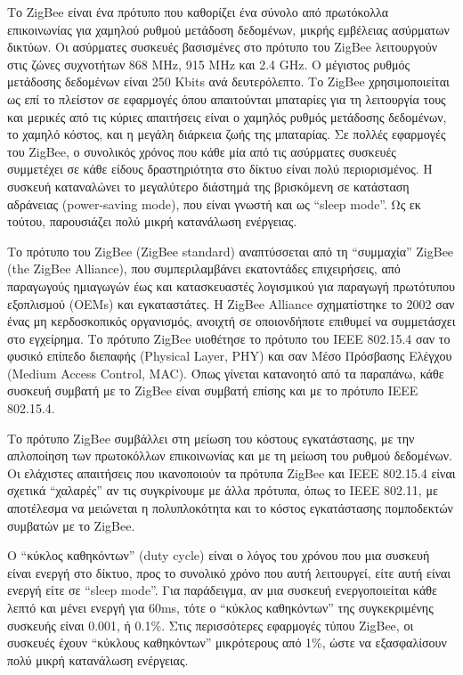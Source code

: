 \documentclass[12pt, a4paper, oneside]{report}
\begin{document}
Το ZigBee είναι ένα πρότυπο που καθορίζει ένα σύνολο από πρωτόκολλα επικοινωνίας για χαμηλού ρυθμού μετάδοση δεδομένων, μικρής εμβέλειας ασύρματων δικτύων. Οι ασύρματες συσκευές βασισμένες στο πρότυπο του ZigBee λειτουργούν στις ζώνες συχνοτήτων 868 MHz, 915 MHz και 2.4 GHz. Ο μέγιστος ρυθμός μετάδοσης δεδομένων είναι 250 Kbits ανά δευτερόλεπτο. Το ZigBee χρησιμοποιείται ως επί το πλείστον σε εφαρμογές όπου απαιτούνται μπαταρίες για τη λειτουργία τους και μερικές από τις κύριες απαιτήσεις είναι ο χαμηλός ρυθμός μετάδοσης δεδομένων, το χαμηλό κόστος, και η μεγάλη διάρκεια ζωής της μπαταρίας. Σε πολλές εφαρμογές του ZigBee, ο συνολικός χρόνος που κάθε μία από τις ασύρματες συσκευές συμμετέχει σε κάθε είδους δραστηριότητα στο δίκτυο είναι πολύ περιορισμένος. Η συσκευή καταναλώνει το μεγαλύτερο διάστημά της βρισκόμενη σε κατάσταση αδράνειας (power-saving mode), που είναι γνωστή και ως ``sleep mode''. Ως εκ τούτου, παρουσιάζει πολύ μικρή κατανάλωση ενέργειας.

Το πρότυπο του ZigBee (ZigBee standard) αναπτύσσεται από τη ``συμμαχία'' ZigBee (the ZigBee Alliance), που συμπεριλαμβάνει εκατοντάδες επιχειρήσεις, από παραγωγούς ημιαγωγών έως και κατασκευαστές λογισμικού για παραγωγή πρωτότυπου εξοπλισμού (OEMs) και εγκαταστάτες. Η ZigBee Alliance σχηματίστηκε το 2002 σαν ένας μη κερδοσκοπικός οργανισμός, ανοιχτή σε οποιονδήποτε επιθυμεί να συμμετάσχει στο εγχείρημα. Το πρότυπο ZigBee υιοθέτησε το πρότυπο του IEEE 802.15.4 σαν το φυσικό επίπεδο διεπαφής (Physical Layer, PHY) και σαν Μέσο Πρόσβασης Ελέγχου (Medium Access Control, MAC). Όπως γίνεται κατανοητό από τα παραπάνω, κάθε συσκευή συμβατή με το ZigBee είναι συμβατή επίσης και με το πρότυπο IEEE 802.15.4.

Το πρότυπο ZigBee συμβάλλει στη μείωση του κόστους εγκατάστασης, με την απλοποίηση των πρωτοκόλλων επικοινωνίας και με τη μείωση του ρυθμού δεδομένων. Οι ελάχιστες απαιτήσεις που ικανοποιούν τα πρότυπα ZigBee και IEEE 802.15.4 είναι σχετικά ``χαλαρές'' αν τις συγκρίνουμε με άλλα πρότυπα, όπως το IEEE 802.11, με αποτέλεσμα να μειώνεται η πολυπλοκότητα και το κόστος εγκατάστασης πομποδεκτών συμβατών με το ZigBee.

Ο ``κύκλος καθηκόντων'' (duty cycle) είναι ο λόγος του χρόνου που μια συσκευή είναι ενεργή στο δίκτυο, προς το συνολικό χρόνο που αυτή λειτουργεί, είτε αυτή είναι ενεργή είτε σε ``sleep mode''. Για παράδειγμα, αν μια συσκευή ενεργοποιείται κάθε λεπτό και μένει ενεργή για 60ms, τότε ο ``κύκλος καθηκόντων'' της συγκεκριμένης συσκευής είναι 0.001, ή 0.1\%. Στις περισσότερες εφαρμογές τύπου ZigBee, οι συσκευές έχουν ``κύκλους καθηκόντων'' μικρότερους από 1\%, ώστε να εξασφαλίσουν πολύ μικρή κατανάλωση ενέργειας.
\end{document}

